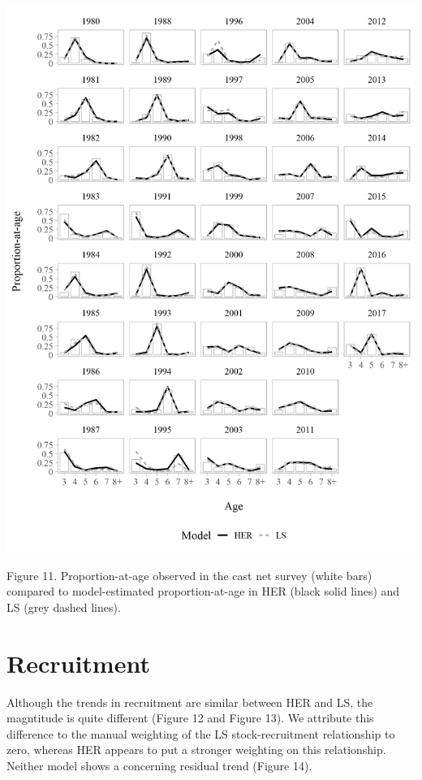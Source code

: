 \documentclass[]{article}
\begin{document}
\includegraphics[width=1\linewidth]{../../HER/figs/compare_spcomp_barplot}

Figure 11. Proportion-at-age observed in the cast net survey (white
bars) compared to model-estimated proportion-at-age in HER (black solid
lines) and LS (grey dashed lines).

\section{Recruitment}\label{recruitment}

Although the trends in recruitment are similar between HER and LS, the
magntitude is quite different (Figure 12 and Figure 13). We attribute
this difference to the manual weighting of the LS stock-recruitment
relationship to zero, whereas HER appears to put a stronger weighting on
this relationship. Neither model shows a concerning residual trend
(Figure 14).
\end{document}
